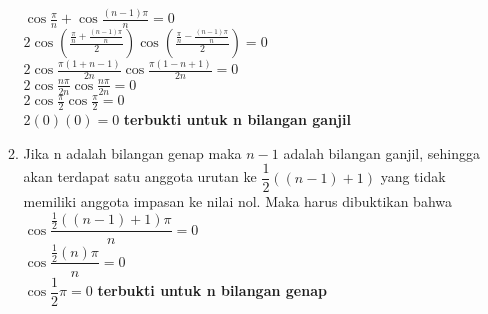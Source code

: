 \documentclass[12pt,a4paper]{article}
\begin{document}
\begin{enumerate}
\begin{enumerate}
				  	$\cos \frac{\pi}{n}+\cos \frac{(n-1)\pi}{n}=0$\medskip \\
				  	$2\cos(\frac{\frac{\pi}{n}+\frac{(n-1)\pi}{n}}{2})\cos(\frac{\frac{\pi}{n}-\frac{(n-1)\pi}{n}}{2})=0$\medskip \\
				  	$2\cos \frac{\pi(1+n-1)}{2n}\cos \frac{\pi(1-n+1)}{2n}=0$\medskip \\
				  	$2\cos \frac{n\pi}{2n}\cos \frac{n\pi}{2n}=0$\medskip \\
				  	$2\cos \frac{\pi}{2}\cos \frac{\pi}{2}=0$\medskip \\
				  	$2(0)(0)=0$ \textbf{terbukti untuk n bilangan ganjil} \medskip \\ 
				  	\item Jika n adalah bilangan genap maka $n-1$ adalah bilangan ganjil, sehingga akan terdapat satu anggota urutan ke $\dfrac{1}{2}((n-1)+1)$ yang tidak memiliki anggota impasan ke nilai nol. Maka harus dibuktikan bahwa\medskip \\ $\cos \dfrac{\frac{1}{2}((n-1)+1)\pi}{n}=0$\medskip \\
				  	$\cos \dfrac{\frac{1}{2}(n)\pi}{n}=0$\medskip \\
				  	$\cos \dfrac{1}{2}\pi=0$ \textbf{terbukti untuk n bilangan genap} \medskip \\
				  	
				  	
				  \end{enumerate} 
				
				  
			   
			   
			   			   
			 
			   
			    
		
			    
		  	  
	\end{enumerate}
\end{document}
